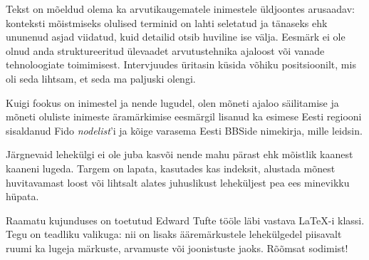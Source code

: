 Tekst on mõeldud olema ka arvutikaugematele inimestele üldjoontes arusaadav: 
konteksti mõistmiseks olulised terminid on lahti seletatud ja tänaseks ehk 
ununenud asjad viidatud, kuid detailid otsib huviline ise välja. Eesmärk ei ole 
olnud anda struktureeritud ülevaadet arvutustehnika ajaloost või vanade 
tehnoloogiate toimimisest. Intervjuudes üritasin küsida võhiku 
positsioonilt, mis oli seda lihtsam, et seda ma paljuski olengi.

Kuigi fookus on inimestel ja nende lugudel, olen mõneti ajaloo säilitamise ja 
mõneti oluliste inimeste äramärkimise eesmärgil lisanud ka esimese Eesti regiooni
sisaldanud Fido \emph{nodelist}'i ja kõige varasema Eesti BBSide nimekirja, mille 
leidsin.

Järgnevaid lehekülgi ei ole juba kasvõi nende mahu pärast ehk mõistlik kaanest 
kaaneni lugeda. Targem on lapata, kasutades kas indeksit, 
alustada mõnest huvitavamast loost või lihtsalt alates juhuslikust leheküljest 
pea ees minevikku hüpata.

Raamatu kujunduses on toetutud Edward Tufte tööle läbi vastava \LaTeX-i klassi.
Tegu on teadliku valikuga: nii on lisaks ääremärkustele lehekülgedel piisavalt ruumi 
ka lugeja märkuste, arvamuste või joonistuste jaoks. Rõõmsat sodimist!

